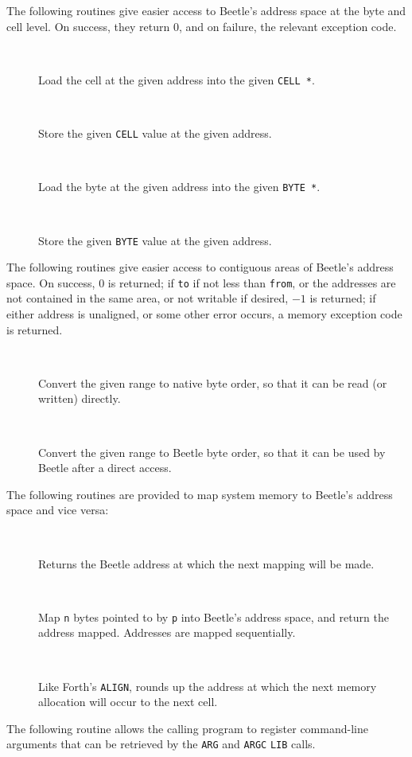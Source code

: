 \documentclass[english]{article}
\newlength{\ifacewidth}\ifacewidth=\textwidth \advance\ifacewidth by -0.1in
\newlength{\innerwidth}\innerwidth=\ifacewidth \advance\innerwidth by -0.5in
\newcommand{\ifacec}[2]{\item[]\parbox{\ifacewidth}{\hspace*{2.5mm}{\tt #1}\\[0.5ex]\hspace*{0.4in}\parbox{\innerwidth}{#2}}}
\begin{document}
The following routines give easier access to Beetle’s address space at the byte and cell level. On success, they return $0$, and on failure, the relevant exception code.

\begin{description}
\ifacec{int beetle\_load\_cell(UCELL address, CELL *value)}{Load the cell at the given address into the given {\tt CELL *}.}
\ifacec{int beetle\_store\_cell(UCELL address, CELL value)}{Store the given {\tt CELL} value at the given address.}
\ifacec{int beetle\_load\_byte(UCELL address, BYTE *value)}{Load the byte at the given address into the given {\tt BYTE *}.}
\ifacec{int beetle\_store\_byte(UCELL address, BYTE value)}{Store the given {\tt BYTE} value at the given address.}
\end{description}

The following routines give easier access to contiguous areas of Beetle’s address space. On success, $0$ is returned; if {\tt to} if not less than {\tt from}, or the addresses are not contained in the same area, or not writable if desired, $-1$ is returned; if either address is unaligned, or some other error occurs, a memory exception code is returned.

\begin{description}
\ifacec{int beetle\_pre\_dma(UCELL from, UCELL to, bool write)}{Convert the given range to native byte order, so that it can be read (or written) directly.}
\ifacec{int beetle\_post\_dma(UCELL from, UCELL to)}{Convert the given range to Beetle byte order, so that it can be used by Beetle after a direct access.}
\end{description}

The following routines are provided to map system memory to Beetle’s address space and vice versa:

\begin{description}
\ifacec{UCELL mem\_here()}{Returns the Beetle address at which the next mapping will be made.}
\ifacec{UCELL mem\_allot(void *p, size\_t n)}{Map {\tt n} bytes pointed to by {\tt p} into Beetle’s address space, and return the address mapped. Addresses are mapped sequentially.}
\ifacec{UCELL mem\_align(void)}{Like Forth’s {\tt ALIGN}, rounds up the address at which the next memory allocation will occur to the next cell.}
\end{description}

The following routine allows the calling program to register command-line arguments that can be retrieved by the {\tt ARG} and {\tt ARGC} {\tt LIB} calls.
\end{document}
